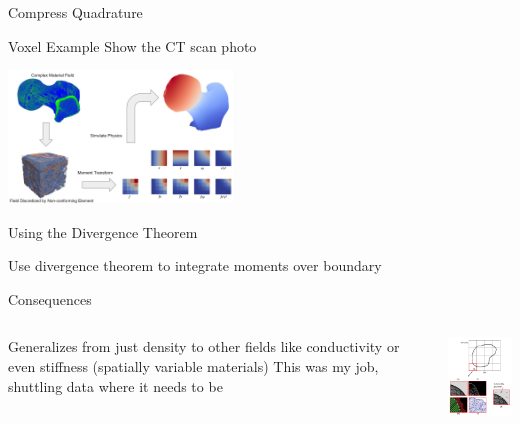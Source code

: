 \begin{frame}{Compress Quadrature}
  \begin{outline}
    \1 Voxel Example
    \1 Show the CT scan photo
  \end{outline}

    \includegraphics[width=6cm]{bone_scan_example.png}\\

\end{frame}

\begin{frame}{Using the Divergence Theorem}
  \begin{outline}
\1 Use divergence theorem to integrate moments over boundary
  \end{outline}
\end{frame}

\begin{frame}{Consequences}
\begin{columns}
  \begin{outline}
    \1 Generalizes from just density to other fields like conductivity or even stiffness (spatially variable materials)
    \1 This was my job, shuttling data where it needs to be
  \end{outline}
\begin{center}
\includegraphics[width=4cm]{immersed_moments.png} 
\end{center}
\end{columns}
\end{frame}

